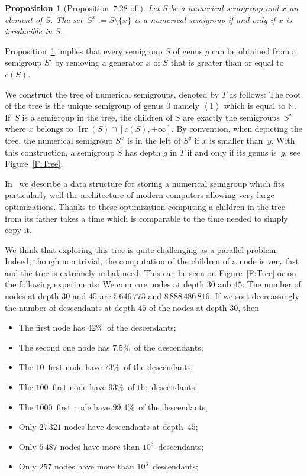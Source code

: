 \documentclass{deliverablereport}
\newcommand{\NN}{\mathbb{N}}
\DeclareMathOperator{\Irr}{Irr}
\newtheorem{prop}{Proposition}
\begin{document}
\begin{prop}[Proposition~7.28 of \cite{BookNS}]
  \label{P:Sx}
  Let $S$ be a numerical semigroup and $x$ an element of $S$. The
  set~$S^x:=S\setminus\{x\}$ is a numerical semigroup if and only if $x$ is
  irreducible in $S$.
\end{prop}
Proposition~\ref{P:Sx} implies that every semigroup $S$ of genus $g$ can be
obtained from a semigroup $S'$ by removing a generator $x$ of $S$ that is
greater than or equal to $c(S)$.

We construct the tree of numerical semigroups, denoted by $T$ as follows: The
root of the tree is the unique semigroup of genus $0$ namely $\left<1\right>$
which is equal to $\NN$.  If~$S$ is a semigroup in the tree, the children of $S$
are exactly the semigroups~$S^x$ where $x$ belongs to
$\Irr(S)\cap[c(S),+\infty]$.  By convention, when depicting the tree, the
numerical semigroup $S^x$ is in the left of $S^y$ if $x$ is smaller than~$y$.
With this construction, a semigroup $S$ has depth $g$ in $T$ if and only if
its genus is~$g$, see Figure~\ref{F:Tree}. 
\bigskip

In~\cite{FromentinH16} we describe a data structure for storing a numerical
semigroup which fits particularly well the architecture of modern computers
allowing very large optimizations. Thanks to these optimization computing a
children in the tree from its father takes a time which is comparable to the
time needed to simply copy it.

We think that exploring this tree is quite challenging as a parallel problem.
Indeed, though non trivial, the computation of the children of a node is very
fast and the tree is extremely unbalanced. This can be seen on
Figure~\ref{F:Tree} or on the following experiments: We compare nodes at depth
$30$ anb $45$: The number of nodes at depth 30 and 45 are $5\,646\,773$ and
$8\,888\,486\,816$. If we sort decreassingly the number of descendants at depth
$45$ of the nodes at depth $30$, then
\begin{itemize}
\item The first node has $42\%$~of the descendants;
\item The second one node has $7.5\%$~of the descendants;
\item The $10$~first node have $73\%$~of the descendants;
\item The $100$~first node have $93\%$~of the descendants;
\item The $1000$~first node have $99.4\%$~of the descendants;
\item Only $27\,321$ nodes have descendants at depth~$45$;
\item Only $5\,487$ nodes have more than $10^3$~descendants;
\item Only $257$ nodes have more than $10^6$~descendants;
\end{itemize}
\medskip
\end{document}
